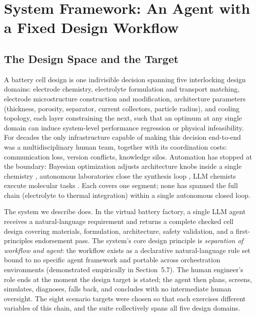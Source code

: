 \section{System Framework: An Agent with a Fixed Design Workflow}
\label{sec:framework}

\subsection{The Design Space and the Target}

A battery cell design is one indivisible decision spanning
five interlocking design domains: electrode chemistry, electrolyte
formulation and transport matching, electrode microstructure construction
and modification, architecture parameters (thickness, porosity, separator,
current collectors, particle radius), and cooling topology, each layer
constraining the next, such that an optimum at any single domain can induce
system-level performance regression or physical infeasibility. For decades
the only infrastructure capable of making this decision end-to-end was a
multidisciplinary human team, together with its coordination costs:
communication loss, version conflicts, knowledge silos. Automation has
stopped at the boundary: Bayesian optimization adjusts architecture knobs
inside a single chemistry \cite{chen2026battery}, autonomous laboratories
close the synthesis loop \cite{szymanski2023alab}, LLM chemists execute
molecular tasks \cite{boiko2023coscientist, bran2024chemcrow}. Each covers
one segment; none has spanned the full chain (electrolyte to thermal
integration) within a single autonomous closed loop.

The system we describe does. In the virtual battery factory, a single LLM
agent receives a natural-language requirement and returns a complete
checked cell design covering materials, formulation, architecture,
safety validation, and a first-principles endorsement pass. The system's
core design principle is \emph{separation of workflow and agent}: the
workflow exists as a declarative natural-language rule set bound to no
specific agent framework and portable across orchestration environments
(demonstrated empirically in Section~5.7). The human engineer's role ends
at the moment the design target is stated; the agent then plans, screens,
simulates, diagnoses, falls back, and concludes with no intermediate human
oversight. The eight scenario targets were chosen so that each exercises
different variables of this chain, and the suite collectively spans all five
design domains.

